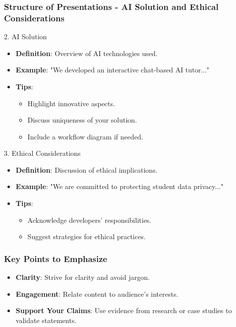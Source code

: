 \documentclass{beamer}
\begin{document}
\begin{frame}[fragile]
    \frametitle{Structure of Presentations - AI Solution and Ethical Considerations}
    \begin{block}{2. AI Solution}
        \begin{itemize}
            \item \textbf{Definition}: Overview of AI technologies used.
            \item \textbf{Example}: "We developed an interactive chat-based AI tutor..."
            \item \textbf{Tips}:
            \begin{itemize}
                \item Highlight innovative aspects.
                \item Discuss uniqueness of your solution.
                \item Include a workflow diagram if needed.
            \end{itemize}
        \end{itemize}
    \end{block}
    
    \begin{block}{3. Ethical Considerations}
        \begin{itemize}
            \item \textbf{Definition}: Discussion of ethical implications.
            \item \textbf{Example}: "We are committed to protecting student data privacy..."
            \item \textbf{Tips}:
            \begin{itemize}
                \item Acknowledge developers' responsibilities.
                \item Suggest strategies for ethical practices.
            \end{itemize}
        \end{itemize}
    \end{block}
\end{frame}

\begin{frame}[fragile]
    \frametitle{Key Points to Emphasize}
    \begin{itemize}
        \item \textbf{Clarity}: Strive for clarity and avoid jargon.
        \item \textbf{Engagement}: Relate content to audience's interests.
        \item \textbf{Support Your Claims}: Use evidence from research or case studies to validate statements.
    \end{itemize}
\end{frame}
\end{document}

